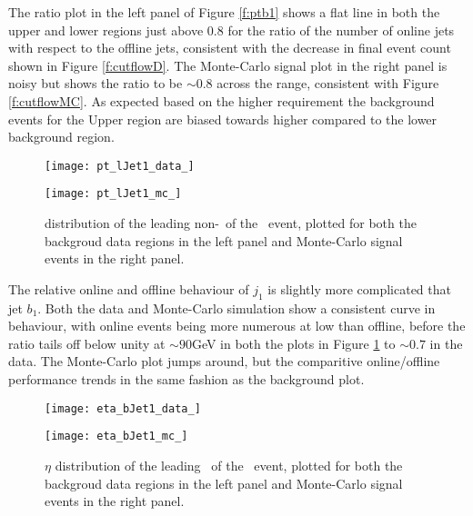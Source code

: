 	The ratio plot in the left panel of Figure \ref{f:ptb1} shows a flat line in both the upper and lower regions just above $0.8$ for the ratio of the number of online jets with respect to the offline jets, consistent with the decrease in final event count shown in Figure \ref{f:cutflowD}. The Monte-Carlo signal plot in the right panel is noisy but shows the ratio to be $\sim0.8$ across the \pt range, consistent with Figure \ref{f:cutflowMC}. As expected based on the higher \mbb requirement the background events for the Upper region are biased towards higher \pt compared to the lower background region.

		\begin{figure}[h]
			\centering

			\begin{minipage}[h]{0.48\linewidth}
				\texttt{[image: pt\_lJet1\_data\_]}
			\end{minipage}
			\quad
			\begin{minipage}[h]{0.48\linewidth}
				\texttt{[image: pt\_lJet1\_mc\_]}
			\end{minipage}
			\label{f:ptj1}
				\caption[\pt distribution of the leading non-\bjet\ of the \VBFHBB\ event]{\pt distribution of the leading non-\bjet\ of the \VBFHBB\ event, plotted for both the backgroud data regions in the left panel and Monte-Carlo signal events in the right panel.}
		\end{figure}

	The relative online and offline behaviour of $j_1$ is slightly more complicated that jet $b_1$. Both the data and Monte-Carlo simulation show a consistent curve in behaviour, with online events being more numerous at low \pt than offline, before the ratio tails off below unity at $\sim90$GeV in both the plots in Figure \ref{f:ptj1} to $\sim 0.7$ in the data. The Monte-Carlo plot jumps around, but the comparitive online/offline performance trends in the same fashion as the background plot.

		\begin{figure}[h]
			\centering

			\begin{minipage}[h]{0.48\linewidth}
				\texttt{[image: eta\_bJet1\_data\_]}
			\end{minipage}
			\quad
			\begin{minipage}[h]{0.48\linewidth}
				\texttt{[image: eta\_bJet1\_mc\_]}
			\end{minipage}
			\label{f:etab1}
			\caption[$\eta$ distribution of the leading \bjet\ of the \VBFHBB\ event]{$\eta$ distribution of the leading \bjet\ of the \VBFHBB\ event, plotted for both the backgroud data regions in the left panel and Monte-Carlo signal events in the right panel.}
		\end{figure}

